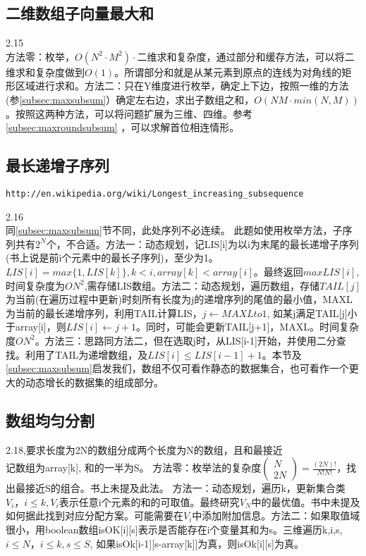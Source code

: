 \label{subsec:maxroundsubsum}

\subsection{二维数组子向量最大和}
\cite{bop}2.15\\
方法零：枚举，$O(N^2 \cdot M^2) \cdot \textrm{二维求和复杂度}$，通过部分和缓存方法，可以将二维求和复杂度做到$O(1)$。所谓部分和就是从某元素到原点的连线为对角线的矩形区域进行求和。方法二：只在Y维度进行枚举，确定上下边，按照一维的方法(参\ref{subsec:maxsubsum}）确定左右边，求出子数组之和，$O(NM \cdot min(N,M))$。按照这两种方法，可以将问题扩展为三维、四维。参考\ref{subsec:maxroundsubsum} ，可以求解首位相连情形。


\subsection{最长递增子序列}
\begin{verbatim}
http://en.wikipedia.org/wiki/Longest_increasing_subsequence
\end{verbatim}
\cite{bop}2.16\\
同\ref{subsec:maxsubsum}节不同，此处序列不必连续。
此题如使用枚举方法，子序列共有$2^N$个，不合适。方法一：动态规划，记LIS[i]为以i为末尾的最长递增子序列(书上说是前i个元素中的最长子序列)，至少为1。$LIS[i]=max\{1,LIS[k]\}, k<i, array[k]<array[i]$。最终返回$max{LIS[i]}$,时间复杂度为$O{N^2}$,需存储LIS数组。方法二：动态规划，遍历数组，存储$TAIL[j]$为当前(在遍历过程中更新)时刻所有长度为j的递增序列的尾值的最小值，MAXL为当前的最长递增序列，利用TAIL计算LIS，$j \gets MAXL to 1$, 如某j满足TAIL[j]小于array[i]，则$LIS[i] \gets j+1$。同时，可能会更新TAIL[j+1]，MAXL。时间复杂度$O{N^2}$。方法三：思路同方法二，但在选取j时，从LIS[i-1]开始，并使用二分查找。利用了TAIL为递增数组，及$LIS[i] \le LIS[i-1]+1$。本节及\ref{subsec:maxsubsum}启发我们，数组不仅可看作静态的数据集合，也可看作一个更大的动态增长的数据集的组成部分。

\subsection{数组均匀分割}
\cite{bop}2.18,要求长度为2N的数组分成两个长度为N的数组，且和最接近\\记数组为array[k], 和的一半为S。
方法零：枚举法的复杂度$\left( \begin{array}{c} N \\ 2N \end{array} \right) = \frac{(2N)!}{N!N!}$，找出最接近S的组合。书上未提及此法。
    方法一：动态规划，遍历k，更新集合类$V_i，i \le k, V_i$表示任意i个元素的和的可取值。最终研究$V_N$中的最优值。书中未提及如何据此找到对应分配方案。可能需要在$V_i$中添加附加信息。方法二：如果取值域很小，用boolean数组isOK[i][s]表示是否能存在i个变量其和为s。三维遍历k,i,s, $i \le N，i \le k, s \le S$, 如果isOk[i-1][s-array[k]]为真，则isOk[i][s]为真。



